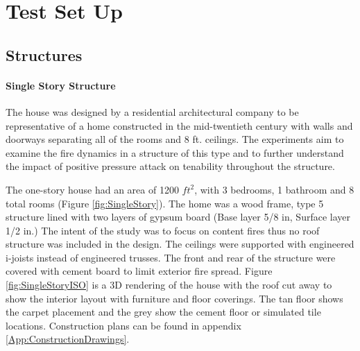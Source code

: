 \documentclass{article}
\begin{document}
\clearpage

\section{Test Set Up}

\subsection{Structures}

\paragraph{Single Story Structure} \mbox{}

The house was designed by a residential architectural company to be representative of a home constructed in the mid-twentieth century with walls and doorways separating all of the rooms and 8 ft. ceilings. The experiments aim to examine the fire dynamics in a structure of this type and to further understand the impact of positive pressure attack on tenability throughout the structure.

The one-story house had an area of 1200 $ft^2$, with 3 bedrooms, 1 bathroom and 8 total rooms (Figure \ref{fig:SingleStory}). The home was a wood frame, type 5 structure lined with two layers of gypsum board (Base layer 5/8 in, Surface layer 1/2 in.) The intent of the study was to focus on content fires thus no roof structure was included in the design. The ceilings were supported with engineered i-joists instead of engineered trusses. The front and rear of the structure were covered with cement board to limit exterior fire spread. Figure \ref{fig:SingleStoryISO} is a 3D rendering of the house with the roof cut away to show the interior layout with furniture and floor coverings. The tan floor shows the carpet placement and the grey show the cement floor or simulated tile locations. Construction plans can be found in appendix \ref{App:ConstructionDrawings}.
\end{document}
